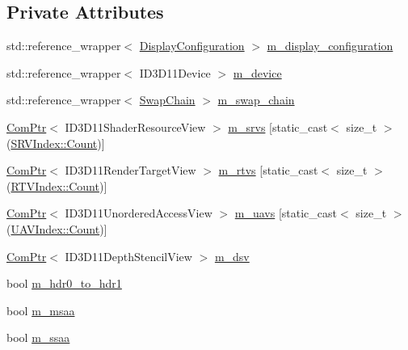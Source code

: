 \subsection*{Private Attributes}
\begin{DoxyCompactItemize}
\item 
std\+::reference\+\_\+wrapper$<$ \hyperlink{classmage_1_1rendering_1_1_display_configuration}{Display\+Configuration} $>$ \hyperlink{classmage_1_1rendering_1_1_output_manager_a41905bc9eb0426c2e75d33d60bb95fbf}{m\+\_\+display\+\_\+configuration}
\item 
std\+::reference\+\_\+wrapper$<$ I\+D3\+D11\+Device $>$ \hyperlink{classmage_1_1rendering_1_1_output_manager_ad0f8b4613dfbd613576a3c58c8ff4c37}{m\+\_\+device}
\item 
std\+::reference\+\_\+wrapper$<$ \hyperlink{classmage_1_1rendering_1_1_swap_chain}{Swap\+Chain} $>$ \hyperlink{classmage_1_1rendering_1_1_output_manager_ac9cffc724a38ffd3d9b49475fd29d3ba}{m\+\_\+swap\+\_\+chain}
\item 
\hyperlink{namespacemage_ae74f374780900893caa5555d1031fd79}{Com\+Ptr}$<$ I\+D3\+D11\+Shader\+Resource\+View $>$ \hyperlink{classmage_1_1rendering_1_1_output_manager_ac002667bd25dd978d6ff0ece782c8455}{m\+\_\+srvs} \mbox{[}static\+\_\+cast$<$ size\+\_\+t $>$(\hyperlink{classmage_1_1rendering_1_1_output_manager_a941f1b35a83ee0ce190494523ec0fe63ae93f994f01c537c4e2f7d8528c3eb5e9}{S\+R\+V\+Index\+::\+Count})\mbox{]}
\item 
\hyperlink{namespacemage_ae74f374780900893caa5555d1031fd79}{Com\+Ptr}$<$ I\+D3\+D11\+Render\+Target\+View $>$ \hyperlink{classmage_1_1rendering_1_1_output_manager_afd0aade15fe5b0f9f4f0bef9f7ea3715}{m\+\_\+rtvs} \mbox{[}static\+\_\+cast$<$ size\+\_\+t $>$(\hyperlink{classmage_1_1rendering_1_1_output_manager_af9caebb7e9cacf454d26b827a01e857cae93f994f01c537c4e2f7d8528c3eb5e9}{R\+T\+V\+Index\+::\+Count})\mbox{]}
\item 
\hyperlink{namespacemage_ae74f374780900893caa5555d1031fd79}{Com\+Ptr}$<$ I\+D3\+D11\+Unordered\+Access\+View $>$ \hyperlink{classmage_1_1rendering_1_1_output_manager_abfdf92e89ef4ee4df40204e84098fdd7}{m\+\_\+uavs} \mbox{[}static\+\_\+cast$<$ size\+\_\+t $>$(\hyperlink{classmage_1_1rendering_1_1_output_manager_a71b3797fef957312f92736f15b7ada3eae93f994f01c537c4e2f7d8528c3eb5e9}{U\+A\+V\+Index\+::\+Count})\mbox{]}
\item 
\hyperlink{namespacemage_ae74f374780900893caa5555d1031fd79}{Com\+Ptr}$<$ I\+D3\+D11\+Depth\+Stencil\+View $>$ \hyperlink{classmage_1_1rendering_1_1_output_manager_a48225f5d17db8e3d0e44adc2689d326f}{m\+\_\+dsv}
\item 
bool \hyperlink{classmage_1_1rendering_1_1_output_manager_aee20394757c9f7ebcaf7f8682747d716}{m\+\_\+hdr0\+\_\+to\+\_\+hdr1}
\item 
bool \hyperlink{classmage_1_1rendering_1_1_output_manager_a3affee412b093ea168b9e4a22c713421}{m\+\_\+msaa}
\item 
bool \hyperlink{classmage_1_1rendering_1_1_output_manager_ae0016fada4d4550d58481d2c313ea524}{m\+\_\+ssaa}
\end{DoxyCompactItemize}


